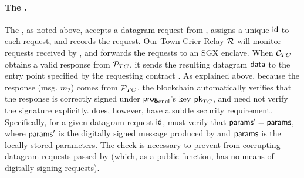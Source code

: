 \paragraph{The \tcontract \tcont.} 
The \tcontract, as noted above, accepts a datagram request from \reqcont, 
assigns a unique ${\sf id}$ to each request, and
records the request.
Our Town Crier Relay $\mathcal{R}$ will monitor
requests received by \tcont, and 
forwards the requests to an SGX enclave.
When ${\cal C}_{TC}$ obtains a valid response
from ${\cal P}_{TC}$,   
it 
sends the resulting datagram ${\sf data}$ to the entry point \dgcallback 
specified by the requesting contract \reqcont. As explained above, because the response (msg. $m_2$) comes from ${\cal P}_{TC}$, the blockchain automatically verifies that the response is correctly signed under ${\sf prog}_{\textrm{encl}}$'s key ${\sf pk}_{TC}$, and \tcont need not verify the signature explicitly. \tc does, however, have a subtle security requirement. Specifically,  for a given datagram request ${\sf id}$, \tcont must verify that ${\sf params}' = {\sf params}$, where ${\sf params}'$ is the digitally signed message produced by \engine and ${\sf params}$ is the locally stored parameters. The check is necessary to prevent \relay from corrupting datagram requests passed by \tcont (which, as a public function, has no means of digitally signing requests). 

